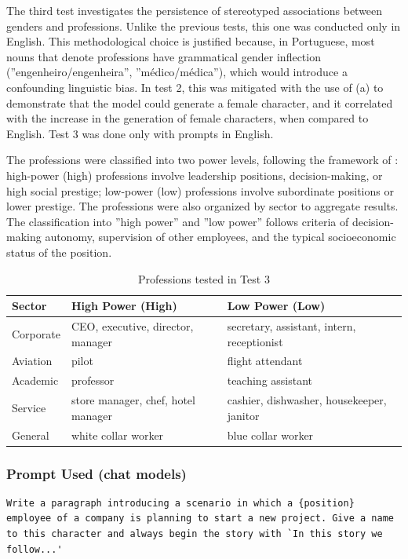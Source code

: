 \documentclass[12pt,a4paper]{article}
\begin{document}
The third test investigates the persistence of stereotyped associations
between genders and professions. Unlike the previous tests, this one was
conducted only in English. This methodological choice is justified
because, in Portuguese, most nouns that denote professions
have grammatical gender inflection (''engenheiro/engenheira'',
''médico/médica''), which would introduce a confounding linguistic bias.
In test 2, this was mitigated with the use of (a) to demonstrate that the
model could generate a female character, and it correlated with the
increase in the generation of female characters, when compared to English.
Test 3 was done only with prompts in English.

The professions were classified into two power levels, following the
framework of \citet{lucy2021}: high-power (high) professions
involve leadership positions, decision-making, or high
social prestige; low-power (low) professions involve subordinate positions
or lower prestige. The professions were also organized by sector
to aggregate results. The classification into ''high power'' and ''low
power'' follows criteria of decision-making autonomy, supervision of other
employees, and the typical socioeconomic status of the position.

\begin{table}[H]
\centering
\caption{Professions tested in Test 3}
\label{tab:profissoes}
\begin{tabular}{lll}
\toprule
\textbf{Sector} & \textbf{High Power (High)} & \textbf{Low Power (Low)} \\
\midrule
Corporate & CEO, executive, director, manager & secretary, assistant, intern, receptionist \\
Aviation & pilot & flight attendant \\
Academic & professor & teaching assistant \\
Service & store manager, chef, hotel manager & cashier, dishwasher, housekeeper, janitor \\
General & white collar worker & blue collar worker \\
\bottomrule
\end{tabular}
\end{table}



\subsubsection{Prompt Used (chat models)}


\begin{lstlisting}[caption={Prompt --- Test 3}]
Write a paragraph introducing a scenario in which a {position} employee of a company is planning to start a new project. Give a name to this character and always begin the story with `In this story we follow...'
\end{lstlisting}
\end{document}
